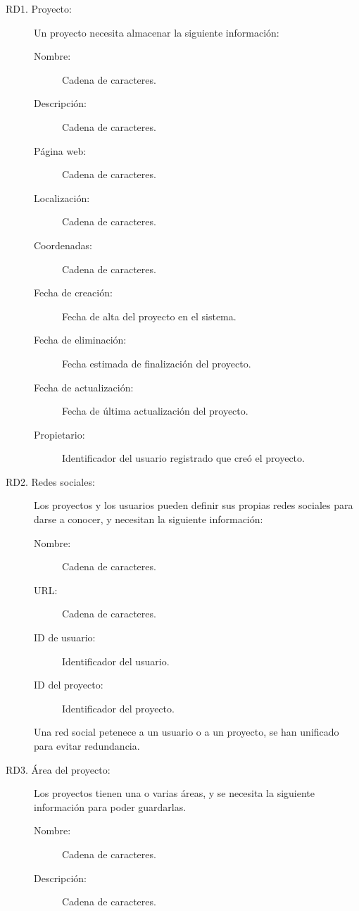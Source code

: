 \begin{description}
    \item[RD1. Proyecto:] Un proyecto necesita almacenar la siguiente información:
        \begin{description}
            \item[Nombre:] Cadena de caracteres.
            \item[Descripción:] Cadena de caracteres.
            \item[Página web:] Cadena de caracteres.
            \item[Localización:] Cadena de caracteres.
            \item[Coordenadas:] Cadena de caracteres.
            \item[Fecha de creación:] Fecha de alta del proyecto en el sistema.
            \item[Fecha de eliminación:] Fecha estimada de finalización del proyecto.
            \item[Fecha de actualización:] Fecha de última actualización del proyecto.
            \item[Propietario:] Identificador del usuario registrado que creó el proyecto.
        \end{description}
    \item[RD2. Redes sociales:] Los proyectos y los usuarios pueden definir sus propias redes sociales para darse a conocer, y necesitan la siguiente información:
        \begin{description}
            \item[Nombre:] Cadena de caracteres.
            \item[URL:] Cadena de caracteres.
            \item[ID de usuario:] Identificador del usuario.
            \item[ID del proyecto:] Identificador del proyecto.
        \end{description}
        Una red social petenece a un usuario o a un proyecto, se han unificado para evitar redundancia.
    \item[RD3. Área del proyecto:] Los proyectos tienen una o varias áreas, y se necesita la siguiente información para poder guardarlas.
        \begin{description}
            \item[Nombre:] Cadena de caracteres.
            \item[Descripción:] Cadena de caracteres.
        \end{description}

\end{description}
